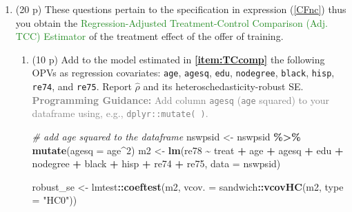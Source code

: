 \documentclass[
]{article}
\newenvironment{Shaded}{\begin{snugshade}}{\end{snugshade}}
\newcommand{\AttributeTok}[1]{\textcolor[rgb]{0.13,0.29,0.53}{#1}}
\newcommand{\CommentTok}[1]{\textcolor[rgb]{0.56,0.35,0.01}{\textit{#1}}}
\newcommand{\DecValTok}[1]{\textcolor[rgb]{0.00,0.00,0.81}{#1}}
\newcommand{\FunctionTok}[1]{\textcolor[rgb]{0.13,0.29,0.53}{\textbf{#1}}}
\newcommand{\NormalTok}[1]{#1}
\newcommand{\OtherTok}[1]{\textcolor[rgb]{0.56,0.35,0.01}{#1}}
\newcommand{\SpecialCharTok}[1]{\textcolor[rgb]{0.81,0.36,0.00}{\textbf{#1}}}
\newcommand{\StringTok}[1]{\textcolor[rgb]{0.31,0.60,0.02}{#1}}
\providecommand{\tightlist}{%
  \setlength{\itemsep}{0pt}\setlength{\parskip}{0pt}}
\begin{document}
\begin{enumerate}
\def\labelenumi{\arabic{enumi}.}
\setcounter{enumi}{4}
\tightlist
\item
  (20 p) These questions pertain to the specification in expression
  (\ref{CFnc}) thus you obtain the
  \textcolor{ForestGreen}{Regression-Adjusted Treatment-Control Comparison (Adj. TCC) Estimator}
  of the treatment effect of the offer of training. \label{item:CFnc}

  \begin{enumerate}
  \def\labelenumii{\alph{enumii}.}
  \item
    (10 p) Add to the model estimated in \textbf{\ref{item:TCcomp}} the
    following OPVs as regression covariates: \texttt{age},
    \texttt{agesq}, \texttt{edu}, \texttt{nodegree}, \texttt{black},
    \texttt{hisp}, \texttt{re74}, and \texttt{re75}. Report
    \(\hat{\rho}\) and its heteroschedasticity-robust SE.
    \textcolor{gray}{\textbf{Programming Guidance:} Add column \texttt{agesq} (\texttt{age} squared) to your dataframe using, e.g., \texttt{dplyr::mutate( )}.}\label{item:CFnc-rho}

\begin{Shaded}
\begin{Highlighting}[]
\CommentTok{\# add age squared to the dataframe}
\NormalTok{nswpsid }\OtherTok{\textless{}{-}}\NormalTok{ nswpsid }\SpecialCharTok{\%\textgreater{}\%} \FunctionTok{mutate}\NormalTok{(}\AttributeTok{agesq =}\NormalTok{ age}\SpecialCharTok{\^{}}\DecValTok{2}\NormalTok{)}
\NormalTok{m2 }\OtherTok{\textless{}{-}} \FunctionTok{lm}\NormalTok{(re78 }\SpecialCharTok{\textasciitilde{}}\NormalTok{ treat }\SpecialCharTok{+}\NormalTok{ age }\SpecialCharTok{+}\NormalTok{ agesq }\SpecialCharTok{+}\NormalTok{ edu }\SpecialCharTok{+} 
\NormalTok{            nodegree }\SpecialCharTok{+}\NormalTok{ black }\SpecialCharTok{+}\NormalTok{ hisp }\SpecialCharTok{+}\NormalTok{ re74 }\SpecialCharTok{+}\NormalTok{ re75, }
            \AttributeTok{data =}\NormalTok{ nswpsid)}

\NormalTok{robust\_se }\OtherTok{\textless{}{-}}\NormalTok{ lmtest}\SpecialCharTok{::}\FunctionTok{coeftest}\NormalTok{(m2, }\AttributeTok{vcov. =}\NormalTok{ sandwich}\SpecialCharTok{::}\FunctionTok{vcovHC}\NormalTok{(m2, }\AttributeTok{type =} \StringTok{"HC0"}\NormalTok{))}


\end{Highlighting}
\end{Shaded}
\end{enumerate}
\end{enumerate}
\end{document}
